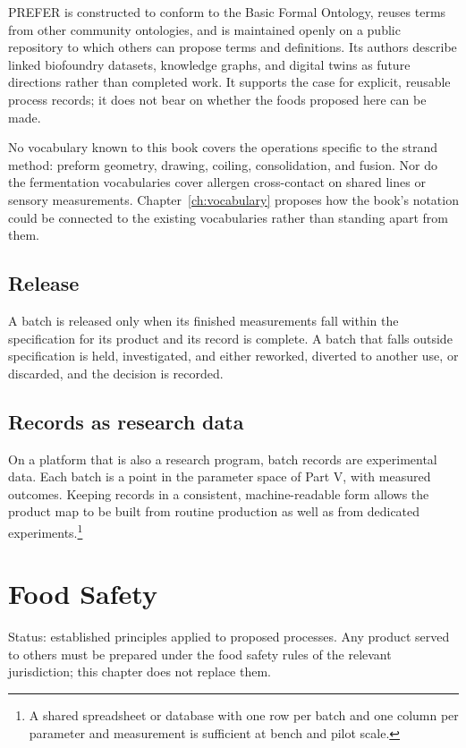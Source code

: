 \documentclass[11pt,openany]{book}
\theoremstyle{definition}
\begin{document}
PREFER is constructed to conform to the Basic Formal Ontology, reuses terms from other community ontologies, and is maintained openly on a public repository to which others can propose terms and definitions. Its authors describe linked biofoundry datasets, knowledge graphs, and digital twins as future directions rather than completed work. It supports the case for explicit, reusable process records; it does not bear on whether the foods proposed here can be made.

No vocabulary known to this book covers the operations specific to the strand method: preform geometry, drawing, coiling, consolidation, and fusion. Nor do the fermentation vocabularies cover allergen cross-contact on shared lines or sensory measurements. Chapter~\ref{ch:vocabulary} proposes how the book's notation could be connected to the existing vocabularies rather than standing apart from them.

\section{Release}

A batch is released only when its finished measurements fall within the specification for its product and its record is complete. A batch that falls outside specification is held, investigated, and either reworked, diverted to another use, or discarded, and the decision is recorded.

\section{Records as research data}

On a platform that is also a research program, batch records are experimental data. Each batch is a point in the parameter space of Part V, with measured outcomes. Keeping records in a consistent, machine-readable form allows the product map to be built from routine production as well as from dedicated experiments.\footnote{A shared spreadsheet or database with one row per batch and one column per parameter and measurement is sufficient at bench and pilot scale.}

\chapter{Food Safety}\label{ch:safety}

Status: established principles applied to proposed processes. Any product served to others must be prepared under the food safety rules of the relevant jurisdiction; this chapter does not replace them.
\end{document}
